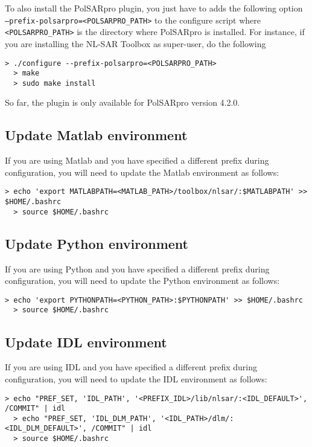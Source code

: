 \documentclass[10pt,french,english,a4paper]{article}
\begin{document}
To also install the PolSARpro plugin, you just have
to adds the following option \texttt{--prefix-polsarpro=<POLSARPRO\_PATH>} to
the configure script
where \texttt{<POLSARPRO\_PATH>} is the directory where PolSARpro is installed.
For instance, if you are installing the NL-SAR Toolbox
as super-user, do the following
\begin{Verbatim}[frame=single]
  > ./configure --prefix-polsarpro=<POLSARPRO_PATH>
  > make
  > sudo make install
\end{Verbatim}
So far, the plugin is only available for PolSARpro version 4.2.0.

\subsection{Update Matlab environment}

If you are using Matlab and you have specified a different prefix during configuration,
you will need to update the Matlab environment as follows:
\begin{Verbatim}[frame=single]
  > echo 'export MATLABPATH=<MATLAB_PATH>/toolbox/nlsar/:$MATLABPATH' >> $HOME/.bashrc
  > source $HOME/.bashrc
\end{Verbatim}

\subsection{Update Python environment}

If you are using Python and you have specified a different prefix during configuration,
you will need to update the Python environment as follows:
\begin{Verbatim}[frame=single]
  > echo 'export PYTHONPATH=<PYTHON_PATH>:$PYTHONPATH' >> $HOME/.bashrc
  > source $HOME/.bashrc
\end{Verbatim}

\subsection{Update IDL environment}

If you are using IDL and you have specified a different prefix during configuration,
you will need to update the IDL environment as follows:
\begin{Verbatim}[frame=single]
  > echo "PREF_SET, 'IDL_PATH', '<PREFIX_IDL>/lib/nlsar/:<IDL_DEFAULT>', /COMMIT" | idl
  > echo "PREF_SET, 'IDL_DLM_PATH', '<IDL_PATH>/dlm/:<IDL_DLM_DEFAULT>', /COMMIT" | idl
  > source $HOME/.bashrc
\end{Verbatim}
\end{document}
